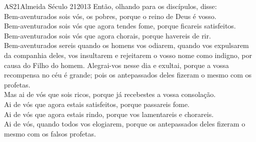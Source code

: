 \begin{traducao}{AS21}{Almeida Século 21}{2013}
Então, olhando para os discípulos, disse:\\
Bem-aventurados sois vós, os pobres, porque o reino de Deus é vosso.\\
Bem-aventurados sois vós que agora tendes fome, porque ficareis satisfeitos.\\
Bem-aventurados sois vós que agora chorais, porque havereis de rir.\\
Bem-aventurados sereis quando os homens vos odiarem, quando vos
expulsarem da companhia deles, vos insultarem e rejeitarem o vosso nome como
indigno, por causa do Filho do homem. Alegrai-vos nesse dia e exultai,
porque a vossa recompensa no céu é grande; pois os antepassados deles fizeram o
mesmo com os profetas.\\
Mas ai de vós que sois ricos, porque já recebestes a vossa consolação.\\
Ai de vós que agora estais satisfeitos, porque passareis fome.\\
Ai de vós que agora estais rindo, porque vos lamentareis e chorareis.\\
Ai de vós, quando todos vos elogiarem, porque os antepassados deles
fizeram o mesmo com os falsos profetas.
\end{traducao}

